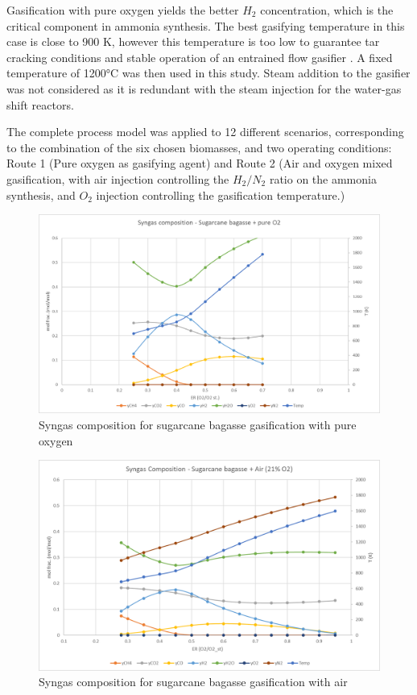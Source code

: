 \documentclass[a4paper, titlepage]{article}
\begin{document}
Gasification with pure oxygen yields the better $H_2$ concentration, which is the critical component in ammonia
synthesis. The best gasifying temperature in this case is close to 900 K, however this temperature is too low to
guarantee tar cracking conditions and stable operation of an entrained flow gasifier
\cite{basuBiomassGasificationPyrolysis2010}. A fixed temperature of 1200°C was then used in this study. Steam addition
to the gasifier was not considered as it is redundant with the steam injection for the water-gas shift reactors.

The complete process model was applied to 12 different scenarios, corresponding to the combination of the six chosen
biomasses, and two operating conditions: Route 1 (Pure oxygen as gasifying agent) and Route 2 (Air and oxygen mixed
gasification, with air injection controlling the $H_2/N_2$ ratio on the ammonia synthesis, and $O_2$ injection
controlling the gasification temperature.)


\begin{figure}[htb]
    \includegraphics[width=\textwidth]{img/fig_syngasbagacoo2.png}
    \caption{Syngas composition for sugarcane bagasse gasification with pure oxygen}
    \label{img_syngascompO2}
\end{figure}

\begin{figure}[htb]
    \includegraphics[width=\textwidth]{img/fig_syngasbagacoar.png}
    \caption{Syngas composition for sugarcane bagasse gasification with air}
    \label{img_syngascompair}
\end{figure}
\end{document}
